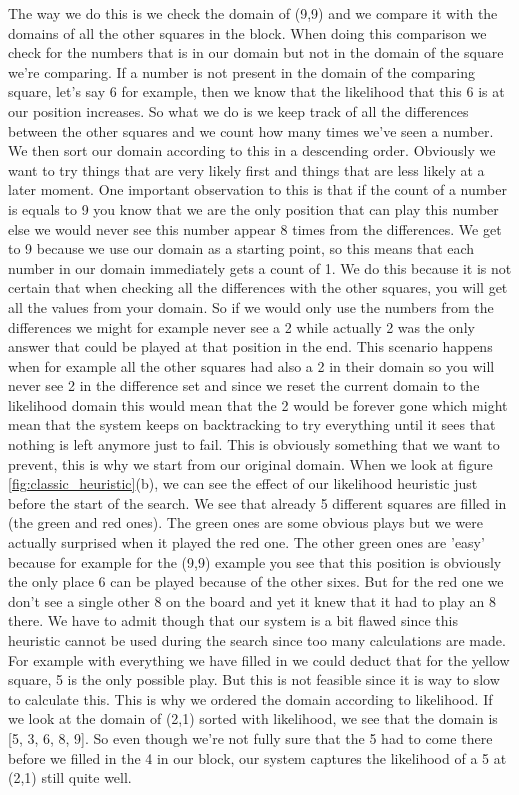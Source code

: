 \documentclass{report}
\begin{document}
The way we do this is we check the domain of (9,9) and we compare it with the domains of all the other squares in the block. When doing this comparison we check for the numbers that is in our domain but not in the domain of the square we're comparing. If a number is not present in the domain of the comparing square, let's say 6 for example, then we know that the likelihood that this 6 is at our position increases. So what we do is we keep track of all the differences between the other squares and we count how many times we've seen a number. We then sort our domain according to this in a descending order. Obviously we want to try things that are very likely first and things that are less likely at a later moment. One important observation to this is that if the count of a number is equals to 9 you know that we are the only position that can play this number else we would never see this number appear 8 times from the differences. We get to 9 because we use our domain as a starting point, so this means that each number in our domain immediately gets a count of 1. We do this because it is not certain that when checking all the differences with the other squares, you will get all the values from your domain. So if we would only use the numbers from the differences we might for example never see a 2 while actually 2 was the only answer that could be played at that position in the end.
\newline
\newline
This scenario happens when for example all the other squares had also a 2 in their domain so you will never see 2 in the difference set and since we reset the current domain to the likelihood domain this would mean that the 2 would be forever gone which might mean that the system keeps on backtracking to try everything until it sees that nothing is left anymore just to fail. This is obviously something that we want to prevent, this is why we start from our original domain. When we look at figure \ref{fig:classic_heuristic}(b), we can see the effect of our likelihood heuristic just before the start of the search. We see that already 5 different squares are filled in (the green and red ones). The green ones are some obvious plays but we were actually surprised when it played the red one. The other green ones are 'easy' because for example for the (9,9) example you see that this position is obviously the only place 6 can be played because of the other sixes. But for the red one we don't see a single other 8 on the board and yet it knew that it had to play an 8 there. We have to admit though that our system is a bit flawed since this heuristic cannot be used during the search since too many calculations are made. For example with everything we have filled in we could deduct that for the yellow square, 5 is the only possible play. But this is not feasible since it is way to slow to calculate this. This is why we ordered the domain according to likelihood. If we look at the domain of (2,1) sorted with likelihood, we see that the domain is [5, 3, 6, 8, 9]. So even though we're not fully sure that the 5 had to come there before we filled in the 4 in our block, our system captures the likelihood of a 5 at (2,1) still quite well.
\end{document}
